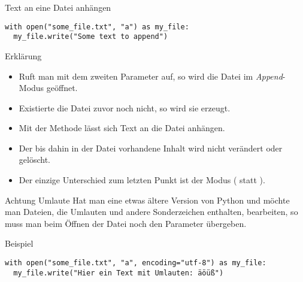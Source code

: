 \begin{fragile}
\begin{block}{Text an eine Datei anhängen}
\pause 
\vspace{2pt}

\begin{verbatim}
with open("some_file.txt", "a") as my_file:
  my_file.write("Some text to append")
\end{verbatim}

\pause
\vspace{12pt}

\begin{exampleblock}{Erklärung}
\vspace{2pt}
\begin{itemize}[<+->]
\item Ruft man  mit dem zweiten Parameter  auf, so wird die Datei im \emph{Append}-Modus geöffnet. 
\item Existierte die Datei zuvor noch nicht, so wird sie erzeugt. 
\item Mit der Methode  lässt sich Text an die Datei anhängen. 
\item Der bis dahin in der Datei vorhandene Inhalt wird nicht verändert oder gelöscht. 
\item Der einzige Unterschied zum letzten Punkt ist der Modus ( statt ).   
\end{itemize}
\end{exampleblock}
\end{block}

\end{fragile}

\begin{fragile}
	
\begin{alertblock}{Achtung Umlaute}
\vspace{2pt}
Hat man eine etwas ältere Version von Python und möchte man Dateien, die Umlauten und andere Sonderzeichen enthalten, bearbeiten, so muss man beim Öffnen der Datei noch den Parameter  übergeben. 
\end{alertblock}	

 \vspace{12pt}
 
\begin{exampleblock}{Beispiel}
	\vspace{2pt}
\begin{verbatim}
with open("some_file.txt", "a", encoding="utf-8") as my_file:
  my_file.write("Hier ein Text mit Umlauten: äöüß")
\end{verbatim}
\end{exampleblock}
\end{fragile}





